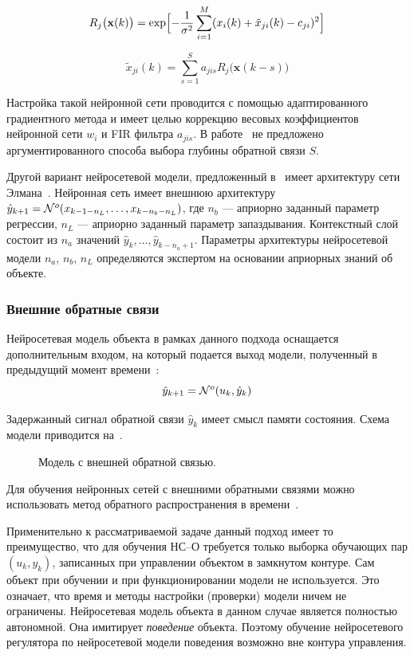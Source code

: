 $$
R_j\bigl(\mathbf{x}(k)\bigr)=
   \exp\Bigl[-\frac{1}{\sigma^2}\sum\limits_{i=1}^M
             (x_i(k)+\tilde{x}_{ji}(k)-c_{ji})^2\Bigr]
$$

$$
\tilde{x}_{ji}(k)=\sum\limits_{s=1}^S a_{jis}R_j\bigl(\mathbf{x}(k-s)\bigr)
$$

Настройка такой нейронной сети проводится с помощью адаптированного
градиентного метода и имеет целью коррекцию весовых коэффициентов
нейронной сети $w_i$ и FIR фильтра $a_{jis}$.  В
работе~\cite{boquete99} не предложено аргументированного способа
выбора глубины обратной связи $S$.

Другой вариант нейросетевой модели, предложенный в~\cite{benne00}
имеет архитектуру сети Элмана~\cite{golovko01}.  Нейронная сеть имеет
внешнюю архитектуру
$\hat{y}_{k+1}=\mathcal{N}^o(x_{k-1-n_L},\ldots,x_{k-n_b-n_L})$, где $n_b$ ---
априорно заданный параметр регрессии, $n_L$ --- априорно заданный
параметр запаздывания.  Контекстный слой состоит из $n_a$ значений
$\hat{y}_{k},\ldots,\hat{y}_{k-n_a+1}$.  Параметры архитектуры
нейросетевой модели $n_a$, $n_b$, $n_L$ определяются экспертом на
основании априорных знаний об объекте.

\subsubsection{Внешние обратные связи}

Нейросетевая модель объекта в рамках данного подхода оснащается
дополнительным входом, на который подается выход модели,
полученный в предыдущий момент времени~\cite{sigom00}:
$$ \hat{y}_{k+1}=\mathcal{N}^o(u_k, \hat{y}_k) $$

Задержанный сигнал обратной связи $\hat{y}_k$ имеет смысл памяти
состояния.  Схема модели приводится на~.

\begin{figure}[h]
  \centering
  
  \caption{Модель с внешней обратной связью.}
  \label{fig:nnp-feedback}
\end{figure}

Для обучения нейронных сетей с внешними обратными связями можно
использовать метод обратного распространения в
времени~\cite{gibb96}\cite{sigom00}.

Применительно к рассматриваемой задаче данный подход имеет то
преимущество, что для обучения НС--О требуется только выборка
обучающих пар $(u_k, y_k)$, записанных при управлении объектом в
замкнутом контуре.  Сам объект при обучении и при функционировании
модели не используется.  Это означает, что время и методы настройки
(проверки) модели ничем не ограничены.  Нейросетевая модель объекта в
данном случае является полностью автономной.  Она имитирует {\it
поведение }объекта.  Поэтому обучение нейросетевого регулятора по
нейросетевой модели поведения возможно вне контура управления.

